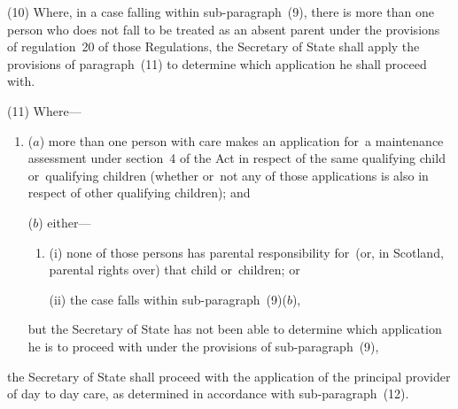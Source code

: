 \documentclass[a4paper,12pt]{article}
\begin{document}
\begin{sloppypar}
(10) Where, in a case falling within sub-paragraph~(9), there is more than one person who does not fall to be treated as an absent parent under the provisions of regulation~20 of those Regulations, 
the Secretary of State  %
shall apply the provisions of paragraph~(11) to determine which application he shall proceed with.
\end{sloppypar}

(11) Where—
\begin{enumerate}\item[]
($a$) more than one person with care makes an application for~a maintenance assessment under section~4 of the Act in respect of the same qualifying child or~qualifying children (whether or~not any of those applications is also in respect of other qualifying children); and

($b$) either—
\begin{enumerate}\item[]
(i) none of those persons has parental responsibility for~(or, in Scotland, parental rights over) that child or~children; or

(ii) the case falls within sub-paragraph~(9)($b$),
\end{enumerate}
but 
the Secretary of State  %
has not been able to determine which application he is to proceed with under the provisions of sub-paragraph~(9),
\end{enumerate}
the Secretary of State  %
shall proceed with the application of the principal provider of day to day care, as determined in accordance with sub-paragraph~(12).
\end{document}
